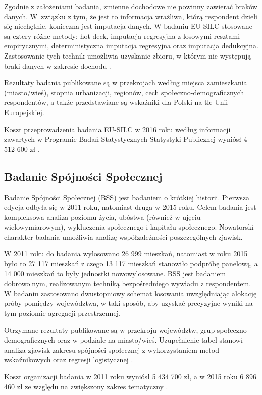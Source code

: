 Zgodnie z założeniami badania, zmienne dochodowe nie powinny zawierać braków danych. W~związku z tym, że jest to informacja wrażliwa, którą respondent dzieli się niechętnie, konieczna jest imputacja danych. W badaniu EU-SILC stosowane są cztery różne metody: hot-deck, imputacja regresyjna z losowymi resztami empirycznymi, deterministyczna imputacja regresyjna oraz imputacja dedukcyjna. Zastosowanie tych technik umożliwia uzyskanie zbioru, w którym nie występują braki danych w zakresie dochodu \citep{silc2017}.

Rezultaty badania publikowane są w przekrojach według miejsca zamieszkania (miasto/wieś), stopnia urbanizacji, regionów, cech społeczno-demograficznych respondentów, a także przedstawiane są wskaźniki dla Polski na tle Unii Europejskiej. 

Koszt przeprowadzenia badania EU-SILC w 2016 roku według informacji zawartych w Programie Badań Statystycznych Statystyki Publicznej wyniósł 4 512 600 zł \citep{pbs2015}.

\subsection{Badanie Spójności Społecznej}

Badanie Spójności Społecznej (BSS) jest badaniem o krótkiej historii. Pierwsza edycja odbyła się w 2011 roku, natomiast druga w 2015 roku. Celem badania jest kompleksowa analiza poziomu życia, ubóstwa (również w ujęciu wielowymiarowym), wykluczenia społecznego i kapitału społecznego. Nowatorski charakter badania umożliwia analizę współzależności poszczególnych zjawisk. 

W 2011 roku do badania wylosowano 26 999 mieszkań, natomiast w roku 2015 było to 27 117 mieszkań z czego 13 117 mieszkań stanowiło podpróbę panelową, a 14 000 mieszkań to były jednostki nowowylosowane. BSS jest badaniem dobrowolnym, realizowanym techniką bezpośredniego wywiadu z respondentem. W badaniu zastosowano dwustopniowy schemat losowania uwzględniając alokację próby pomiędzy województwa, w taki sposób, aby uzyskać precyzyjne wyniki na tym poziomie agregacji przestrzennej. 

Otrzymane rezultaty publikowane są w przekroju województw, grup społeczno-demograficznych oraz w podziale na miasto/wieś. Uzupełnienie tabel stanowi analiza zjawisk zakresu spójności społecznej z wykorzystaniem metod wskaźnikowych oraz regresji logistycznej \citep{jakosc-gus2013,jakosc-gus2017}. 

Koszt organizacji badania w 2011 roku wyniósł 5 434 700 zł, a w 2015 roku 6 896 460 zł ze względu na zwiększony zakres tematyczny \citep{pbs2010,pbs2014}.

